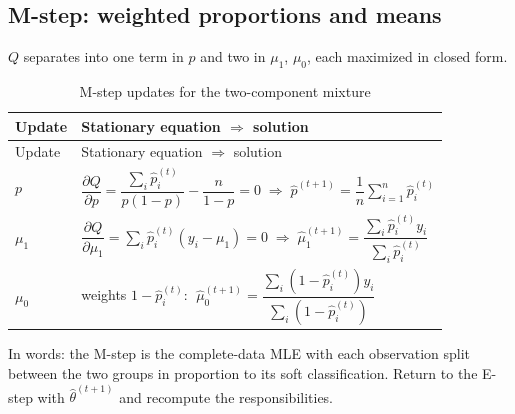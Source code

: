\documentclass[
  letterpaper,
  DIV=11,
  numbers=noendperiod]{scrreprt}
\begin{document}
\subsection{M-step: weighted proportions and
means}\label{m-step-weighted-proportions-and-means}

\(Q\) separates into one term in \(p\) and two in \(\mu_1\), \(\mu_0\),
each maximized in closed form.

\begin{longtable}[]{@{}
  >{\raggedright\arraybackslash}p{}
  >{\raggedright\arraybackslash}p{}@{}}
\caption{M-step updates for the two-component
mixture}\label{tbl-mstep-mixture}\tabularnewline
\toprule\noalign{}
\begin{minipage}[b]{\linewidth}\raggedright
Update
\end{minipage} & \begin{minipage}[b]{\linewidth}\raggedright
Stationary equation \(\Longrightarrow\) solution
\end{minipage} \\
\midrule\noalign{}
\endfirsthead
\toprule\noalign{}
\begin{minipage}[b]{\linewidth}\raggedright
Update
\end{minipage} & \begin{minipage}[b]{\linewidth}\raggedright
Stationary equation \(\Longrightarrow\) solution
\end{minipage} \\
\midrule\noalign{}
\endhead
\bottomrule\noalign{}
\endlastfoot
\(p\) &
\(\dfrac{\partial Q}{\partial p} = \dfrac{\sum_i \hat p_i^{(t)}}{p(1-p)} - \dfrac{n}{1-p} = 0 \;\Longrightarrow\; \hat p^{(t+1)} = \dfrac{1}{n}\sum_{i=1}^{n} \hat p_i^{(t)}\) \\
\(\mu_1\) &
\(\dfrac{\partial Q}{\partial \mu_1} = \sum_i \hat p_i^{(t)}(y_i - \mu_1) = 0 \;\Longrightarrow\; \hat\mu_1^{(t+1)} = \dfrac{\sum_i \hat p_i^{(t)} y_i}{\sum_i \hat p_i^{(t)}}\) \\
\(\mu_0\) & weights \(1 - \hat p_i^{(t)}\):
\(\;\hat\mu_0^{(t+1)} = \dfrac{\sum_i \left(1 - \hat p_i^{(t)}\right) y_i}{\sum_i \left(1 - \hat p_i^{(t)}\right)}\) \\
\end{longtable}

In words: the M-step is the complete-data MLE with each observation
split between the two groups in proportion to its soft classification.
Return to the E-step with \(\hat\theta^{(t+1)}\) and recompute the
responsibilities.
\end{document}
